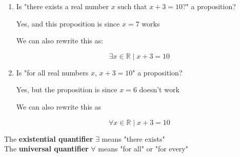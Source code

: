 \documentclass[../../Main.tex]{subfiles}
\begin{document}
\begin{example}
    \begin{enumerate}

        \item 
            Is "there exists a real number $x$ such that $x + 3 = 10$?" a proposition?
        
            \begin{solution}
                Yes, and this proposition is \TRUE since $x = 7$ works
            \end{solution}
        
            We can also rewrite this as:
        
            $$\exists x \in \mathbb{R} \mid x + 3 = 10$$

        \item 
            Is "for all real numbers $x$, $x + 3 = 10$" a proposition?

            \begin{solution}
                Yes, but the proposition is \FALSE since $x = 6$ doesn't work
            \end{solution}
            
            We can also rewrite this as

            $$\forall x \in \mathbb{R} \mid x + 3 = 10$$
        
    \end{enumerate}
\end{example}

\begin{definition}[Quantifiers]
    The \textbf{existential quantifier} $\exists$ means "there exists"
    \\
    The \textbf{universal quantifier} $\forall$ means "for all" or "for every"
\end{definition}
\end{document}
